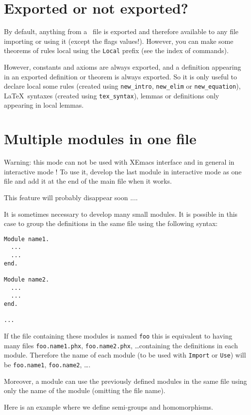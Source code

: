 \section{Exported or not exported?}

By default, anything from a \AFD\ file is exported and therefore available to
any file importing or using it (except the flags values!). However, you can
make some theorems of rules local using the {\tt Local} prefix (see
the index of commands). 

However, constants and axioms are always exported, and a definition appearing
in an exported definition or theorem is always exported. So it is only useful
to declare local some rules (created using {\tt new\_intro}, {\tt new\_elim}
or {\tt new\_equation}), \LaTeX\ syntaxes (created using {\tt tex\_syntax}),
lemmas or definitions only appearing in local lemmas.

\section{Multiple modules in one file}

Warning: this mode can not be used with XEmacs interface and in general
in interactive mode ! To use it, develop the last module in
interactive mode as one file and add it at the end of the main file when it
works.

This feature will probably disappear soon ....

It is sometimes necessary to develop many small modules. It is possible in
this case to group the definitions in the same file using the following
syntax:

\begin{verbatim}
Module name1.
  ...
  ...
end.

Module name2.
  ...
  ...
end.

...
\end{verbatim}

If the file containing these modules is named {\tt foo} this is
equivalent to having many files {\tt foo.name1.phx}, {\tt foo.name2.phx},
\dots containing the definitions in each module. Therefore the name of each
module (to be used with {\tt Import} or {\tt Use}) will be {\tt foo.name1},
{\tt foo.name2}, \dots.

Moreover, a module can use the previously defined modules in the same
file using only the name of the module (omitting the file name).

Here is an example where we define semi-groups and homomorphisms.

